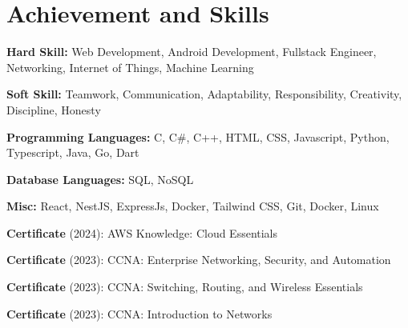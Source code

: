 \documentclass[../main.tex]{subfiles}
\begin{document}
\section{Achievement and Skills}
\begin{highlights}
    \item \textbf{Hard Skill:} Web Development, Android Development, Fullstack Engineer, Networking, Internet of Things, Machine Learning
    \item \textbf{Soft Skill:} Teamwork, Communication, Adaptability, Responsibility, Creativity, Discipline, Honesty
    \item \textbf{Programming Languages:} C, C\#, C++, HTML, CSS, Javascript, Python, Typescript, Java, Go, Dart
    \item \textbf{Database Languages:} SQL, NoSQL
    \item \textbf{Misc:} React, NestJS, ExpressJs, Docker, Tailwind CSS, Git, Docker, Linux
    \item \textbf{Certificate} (2024): AWS Knowledge: Cloud Essentials
    \item \textbf{Certificate} (2023): CCNA: Enterprise Networking, Security, and Automation
    \item \textbf{Certificate} (2023): CCNA: Switching, Routing, and Wireless Essentials
    \item \textbf{Certificate} (2023): CCNA: Introduction to Networks
\end{highlights}
\end{document}
